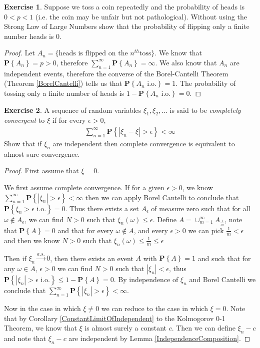 \documentclass{amsbook}
\theoremstyle{definition}
\newtheorem{xca}{Exercise}
\theoremstyle{remark}
\newcommand{\probability}[1]{\textbf{P}\left \{#1 \right \}}
\newcommand{\abs}[1]{\left \vert #1 \right \vert}
\newcommand{\toas}{\overset{a.s.}\to}
\begin{document}
\begin{xca}Suppose we toss a coin repeatedly and the probability of
  heads is $0 < p < 1$ (i.e. the coin may be unfair but not
  pathological).  Without using the Strong Law of Large Numbers show
  that the probability of flipping only a finite number heads is $0$.
\end{xca}
\begin{proof}
Let $A_n = \lbrace \text{heads is flipped on the }n^{th}\text{
  toss}\rbrace$.  We know that $\probability{A_n} = p >0$, therefore
$\sum_{n=1}^\infty \probability{A_n} = \infty$.  We also know that
$A_n$ are independent events, therefore the converse of the
Borel-Cantelli Theorem (Theorem \ref{BorelCantelli}) tells us that $\probability{ A_n \text{ i.o.}}
= 1$.  The probability of tossing only a finite number of
heads is $1 - \probability{ A_n \text{ i.o.}} = 0$.
\end{proof}

\begin{xca}A sequence of random variables $\xi_1, \xi_2, \dots$ is said
  to be \emph{completely convergent} to $\xi$ if for every $\epsilon > 0$,
\begin{align*}
\sum_{n=1}^\infty \probability{\abs{\xi_n - \xi} > \epsilon} < \infty
\end{align*}
Show that if $\xi_n$ are independent then complete convergence is
equivalent to almost sure convergence.
\end{xca}
\begin{proof}
First assume that $\xi=0$.  

We first assume complete convergence.  If for a given $\epsilon > 0$, we know $\sum_{n=1}^\infty
\probability{\abs{\xi_n} > \epsilon} < \infty$ then we can apply
Borel Cantelli to conclude that $\probability{\xi_n > \epsilon \text{ i.o.}} =
0$.  Thus there exists a set $A_\epsilon$ of measure zero such that
for all $\omega \notin A_\epsilon$, we can find $N>0$ such that
$\xi_n(\omega) \leq \epsilon$.  Define $A = \cup_{m=1}^\infty A_\frac{1}{m}$,
note that $\probability{A} = 0$ and that for every $\omega \notin A$,
and every $\epsilon >0$ we can pick $\frac{1}{m} < \epsilon$  and then
we know  $N>0$ such that $\xi_n(\omega) \leq \frac{1}{m} \leq \epsilon$

Then if $\xi_n \toas 0$, then there
exists an event $A$ with $\probability{A} = 1$ and such that for any
$\omega \in A$, $\epsilon>0$ we can find $N > 0$ such that
$\abs{\xi_n} < \epsilon$, thus $\probability{\abs{\xi_n} > \epsilon
  \text{ i.o.}} \leq 1 - \probability{A} = 0$.  By independence of
$\xi_n$ and Borel Cantelli we conclude that $\sum_{n=1}^\infty
\probability{\abs{\xi_n} > \epsilon} < \infty$.

Now in the case in which $\xi \neq 0$ we can reduce to the case in
which $\xi = 0$.  Note that by Corollary
\ref{ConstantLimitOfIndependent} to the Kolmogorov 0-1 Theorem, we
know that $\xi$ is almost surely a constant $c$.  Then we can define $\xi_n
- c$ and note that $\xi_n - c$ are independent by Lemma \ref{IndependenceComposition}.
\end{proof}
\end{document}
